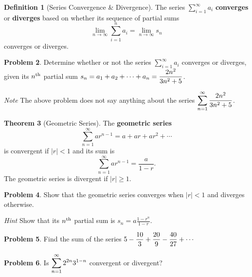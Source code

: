 \documentclass[letterpaper, twoside, 12pt]{book}
\theoremstyle{definition}
\newtheorem{theorem}{Theorem}
\theoremstyle{definition}
\newtheorem{definition}[theorem]{Definition}
\newtheorem{problem}[theorem]{Problem}
\newcommand{\ds}{\ensuremath{\displaystyle}}
\begin{document}
\begin{definition}[Series Convergence \& Divergence]
  The series $\sum_{i=1}^\infty a_i$ \textbf{converges} or \textbf{diverges}
  based on whether its sequence of partial sums
    \[
      \lim_{n\to\infty}\sum_{i=1}^n a_i
      = \lim_{n\to\infty} s_n
    \]
  converges or diverges.
\end{definition}

\newpage

\begin{problem}
  Determine whether or not the series $\sum_{i=1}^\infty a_i$ converges or
  diverges, given its $n^{\rm th}$ partial sum
  $\ds s_n = a_1 + a_2 + \cdots + a_n = \frac{2n^2}{3n^2+5}$.
\end{problem}

\vfill

\noindent\emph{Note} The above problem does not say anything about the series
$\ds \sum_{n = 1}^{\infty} \frac{2n^2}{3n^2+5}$.


\begin{theorem}[Geometric Series]
 The \textbf{geometric series} $$\sum_{n = 1}^{\infty} ar^{n-1} = a + ar + ar^2 + \cdots$$ is convergent if $\left|r\right| < 1$ and its sum is $$\sum_{n = 1}^{\infty} ar^{n-1} = \frac{a}{1-r}.$$  The geometric series is divergent if $\left|r\right| \geq 1$.
\end{theorem}


\begin{problem}
 Show that the geometric series converges when $\left|r\right| < 1$ and diverges otherwise.
\end{problem}

\noindent\emph{Hint} Show that its $n^{\rm th}$ partial sum is
$s_n = a\frac{1-r^n}{1-r}$.

\vfill

\newpage

\begin{problem}
 Find the sum of the series $\ds 5 - \frac{10}{3} + \frac{20}{9} - \frac{40}{27} + \cdots$
\end{problem}

\vfill

\begin{problem}
 Is $\ds \sum_{n = 1}^{\infty} 2^{2n}3^{1-n}$ convergent or divergent?
\end{problem}

\vfill
\end{document}
